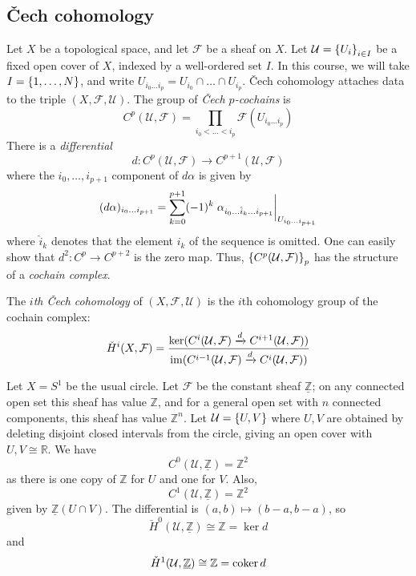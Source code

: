 \subsection{\v{C}ech cohomology}
Let \( X \) be a topological space, and let \( \mathcal F \) be a sheaf on \( X \).
Let \( \mathcal U = \qty{U_i}_{i \in I} \) be a fixed open cover of \( X \), indexed by a well-ordered set \( I \).
In this course, we will take \( I = \qty{1, \dots, N} \), and write \( U_{i_0 \dots i_p} = U_{i_0} \cap \dots \cap U_{i_p} \).
\v{C}ech cohomology attaches data to the triple \( (X, \mathcal F, \mathcal U) \).
The group of \emph{\v{C}ech \( p \)-cochains} is
\[ C^p(\mathcal U, \mathcal F) = \prod_{i_0 < \dots < i_p} \mathcal F(U_{i_0 \dots i_p}) \]
There is a \emph{differential}
\[ d : C^p(\mathcal U, \mathcal F) \to C^{p+1}(\mathcal U, \mathcal F) \]
where the \( i_0, \dots, i_{p+1} \) component of \( d\alpha \) is given by
\[ (d\alpha)_{i_0 \dots i_{p+1}} = \sum_{k=0}^{p+1} (-1)^k \eval{\alpha_{i_0\dots \hat i_k \dots i_{p+1}}}_{U_{i_0 \dots i_{p+1}}} \]
where \( \hat i_k \) denotes that the element \( i_k \) of the sequence is omitted.
One can easily show that \( d^2 : C^p \to C^{p+2} \) is the zero map.
Thus, \( \qty{C^p(\mathcal U, \mathcal F)}_p \) has the structure of a \emph{cochain complex}.
\begin{definition}
	The \emph{\( i \)th \v{C}ech cohomology} of \( (X, \mathcal F, \mathcal U) \) is the \( i \)th cohomology group of the cochain complex:
	\[ \check{H}^i(X, \mathcal F) = \frac{\ker(C^i(\mathcal U, \mathcal F) \xrightarrow d C^{i+1}(\mathcal U, \mathcal F))}{\operatorname{im}(C^{i-1}(\mathcal U, \mathcal F) \xrightarrow d C^i(\mathcal U, \mathcal F))} \]
\end{definition}
\begin{example}
	Let \( X = S^1 \) be the usual circle.
	Let \( \mathcal F \) be the constant sheaf \( \underline{\mathbb Z} \); on any connected open set this sheaf has value \( \mathbb Z \), and for a general open set with \( n \) connected components, this sheaf has value \( \mathbb Z^n \).
	Let \( \mathcal U = \qty{U, V} \) where \( U, V \) are obtained by deleting disjoint closed intervals from the circle, giving an open cover with \( U, V \cong \mathbb R \).
	We have
	\[ C^0(\mathcal U, \underline{\mathbb Z}) = \mathbb Z^2 \]
	as there is one copy of \( \mathbb Z \) for \( U \) and one for \( V \).
	Also,
	\[ C^1(\mathcal U, \underline{\mathbb Z}) = \mathbb Z^2 \]
	given by \( \underline{\mathbb Z}(U \cap V) \).
	The differential is \( (a, b) \mapsto (b-a, b-a) \), so
	\[ \check{H}^0(\mathcal U, \underline{\mathbb Z}) \cong \mathbb Z = \ker d \]
	and
	\[ \check{H}^1(\mathcal U, \underline{\mathbb Z}) \cong \mathbb Z = \operatorname{coker} d \]
\end{example}

